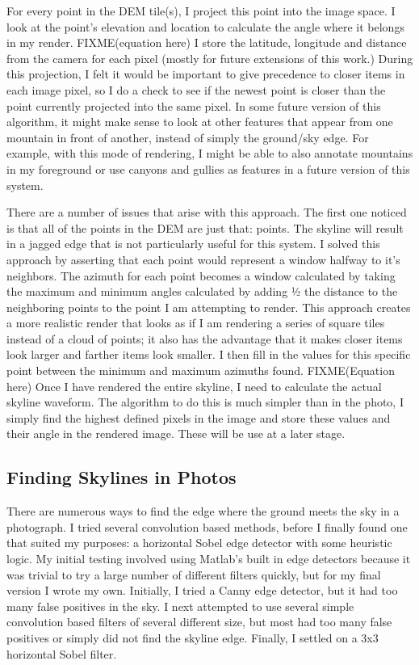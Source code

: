 \documentclass{acm_proc_article-sp}
\begin{document}
For every point in the DEM tile(s), I project this point into the image space.  I look at the point’s elevation and location to calculate the angle where it belongs in my render.  FIXME(equation here) I store the latitude, longitude and distance from the camera for each pixel (mostly for future extensions of this work.) During this projection, I felt it would be important to give precedence to closer items in each image pixel, so I do a check to see if the newest point is closer than the point currently projected into the same pixel.  In some future version of this algorithm, it might make sense to look at other features that appear from one mountain in front of another, instead of simply the ground/sky edge. For example, with this mode of rendering, I might be able to also annotate mountains in my foreground or use canyons and gullies as features in a future version of this system.

There are a number of issues that arise with this approach.  The first one noticed is that all of the points in the DEM are just that: points.  The skyline will result in a jagged edge that is not particularly useful for this system.  I solved this approach by asserting that each point would represent a window halfway to it’s neighbors.  The azimuth for each point becomes a window calculated by taking the maximum and minimum angles calculated by adding ½ the distance to the neighboring points to the point I am attempting to render.  This approach creates a more realistic render that looks as if I am rendering a series of square tiles instead of a cloud of points; it also has the advantage that it makes closer items look larger and farther items look smaller.  I then fill in the values for this specific point between the minimum and maximum azimuths found. FIXME(Equation here)
    Once I have rendered the entire skyline, I need to calculate the actual skyline waveform.  The algorithm to do this is much simpler than in the photo, I simply find the highest defined pixels in the image and store these values and their angle in the rendered image. These will be use at a later stage.

\subsection{Finding Skylines in Photos}
    There are numerous ways to find the edge where the ground meets the sky in a photograph.  I tried several convolution based methods, before I finally found one that suited my purposes:  a horizontal Sobel edge detector with some heuristic logic.  My initial testing involved using Matlab’s built in edge detectors \cite{mcandrew2004introduction} because it was trivial to try a large number of different filters quickly, but for my final version I wrote my own.  Initially, I tried a Canny edge detector, but it had too many false positives in the sky.  I next attempted to use several simple convolution \cite{Schafer:DSP} based filters of several different size, but most had too many false positives or simply did not find the skyline edge.  Finally, I settled on a 3x3 horizontal Sobel filter. \cite{behringer2002registration}  
\end{document}
